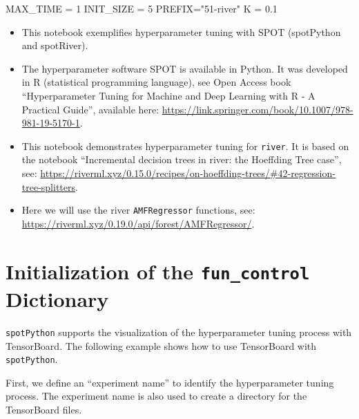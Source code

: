 \documentclass[
  letterpaper,
  DIV=11,
  numbers=noendperiod]{scrreprt}
\newenvironment{Shaded}{\begin{snugshade}}{\end{snugshade}}
\newcommand{\DecValTok}[1]{\textcolor[rgb]{0.68,0.00,0.00}{#1}}
\newcommand{\FloatTok}[1]{\textcolor[rgb]{0.68,0.00,0.00}{#1}}
\newcommand{\NormalTok}[1]{\textcolor[rgb]{0.00,0.23,0.31}{#1}}
\newcommand{\OperatorTok}[1]{\textcolor[rgb]{0.37,0.37,0.37}{#1}}
\newcommand{\StringTok}[1]{\textcolor[rgb]{0.13,0.47,0.30}{#1}}
\providecommand{\tightlist}{%
  \setlength{\itemsep}{0pt}\setlength{\parskip}{0pt}}\usepackage{longtable,booktabs,array}
\begin{document}
\begin{Shaded}
\begin{Highlighting}[]
\NormalTok{MAX\_TIME }\OperatorTok{=} \DecValTok{1}
\NormalTok{INIT\_SIZE }\OperatorTok{=} \DecValTok{5}
\NormalTok{PREFIX}\OperatorTok{=}\StringTok{"51{-}river"}
\NormalTok{K }\OperatorTok{=} \FloatTok{0.1}
\end{Highlighting}
\end{Shaded}

\begin{itemize}
\tightlist
\item
  This notebook exemplifies hyperparameter tuning with SPOT (spotPython
  and spotRiver).
\item
  The hyperparameter software SPOT is available in Python. It was
  developed in R (statistical programming language), see Open Access
  book ``Hyperparameter Tuning for Machine and Deep Learning with R - A
  Practical Guide'', available here:
  \url{https://link.springer.com/book/10.1007/978-981-19-5170-1}.
\item
  This notebook demonstrates hyperparameter tuning for \texttt{river}.
  It is based on the notebook ``Incremental decision trees in river: the
  Hoeffding Tree case'', see:
  \url{https://riverml.xyz/0.15.0/recipes/on-hoeffding-trees/\#42-regression-tree-splitters}.
\item
  Here we will use the river \texttt{AMFRegressor} functions, see:
  \url{https://riverml.xyz/0.19.0/api/forest/AMFRegressor/}.
\end{itemize}

\hypertarget{initialization-of-the-fun_control-dictionary-1}{%
\section{\texorpdfstring{Initialization of the \texttt{fun\_control}
Dictionary}{Initialization of the fun\_control Dictionary}}\label{initialization-of-the-fun_control-dictionary-1}}

\texttt{spotPython} supports the visualization of the hyperparameter
tuning process with TensorBoard. The following example shows how to use
TensorBoard with \texttt{spotPython}.

First, we define an ``experiment name'' to identify the hyperparameter
tuning process. The experiment name is also used to create a directory
for the TensorBoard files.
\end{document}
